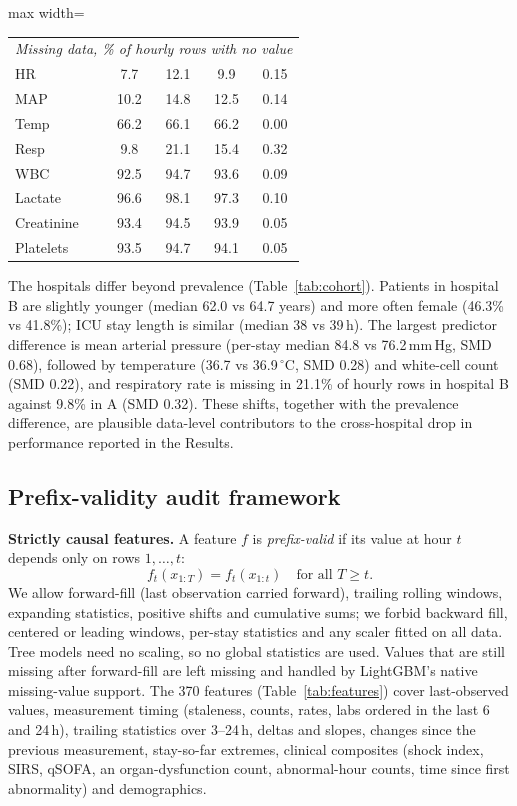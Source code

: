 \documentclass[preprint,12pt]{elsarticle}
\begin{document}
\begin{table}[!t]
\begin{adjustbox}{max width=\linewidth}
\begin{tabular}{lcccc}
\midrule
\multicolumn{5}{l}{\emph{Missing data, \% of hourly rows with no value}} \\
HR & 7.7 & 12.1 & 9.9 & 0.15 \\
MAP & 10.2 & 14.8 & 12.5 & 0.14 \\
Temp & 66.2 & 66.1 & 66.2 & 0.00 \\
Resp & 9.8 & 21.1 & 15.4 & 0.32 \\
WBC & 92.5 & 94.7 & 93.6 & 0.09 \\
Lactate & 96.6 & 98.1 & 97.3 & 0.10 \\
Creatinine & 93.4 & 94.5 & 93.9 & 0.05 \\
Platelets & 93.5 & 94.7 & 94.1 & 0.05 \\
\bottomrule
\end{tabular}
\end{adjustbox}
\end{table}


The hospitals differ beyond prevalence (Table~\ref{tab:cohort}). Patients in hospital B are slightly younger (median 62.0 vs 64.7 years) and more often female (46.3\% vs 41.8\%); ICU stay length is similar (median 38 vs 39\,h). The largest predictor difference is mean arterial pressure (per-stay median 84.8 vs 76.2\,mm\,Hg, SMD 0.68), followed by temperature (36.7 vs 36.9\,$^\circ$C, SMD 0.28) and white-cell count (SMD 0.22), and respiratory rate is missing in 21.1\% of hourly rows in hospital B against 9.8\% in A (SMD 0.32). These shifts, together with the prevalence difference, are plausible data-level contributors to the cross-hospital drop in performance reported in the Results.


\subsection{Prefix-validity audit framework}
\label{sec:method}
\label{sec:audit}
\textbf{Strictly causal features.} A feature $f$ is \emph{prefix-valid} if its value at hour $t$ depends only on rows $1,\dots,t$:
\begin{equation}
f_t(x_{1:T}) = f_t(x_{1:t}) \quad \text{for all } T\ge t.
\label{eq:prefix}
\end{equation}
We allow forward-fill (last observation carried forward), trailing rolling windows, expanding statistics, positive shifts and cumulative sums; we forbid backward fill, centered or leading windows, per-stay statistics and any scaler fitted on all data. Tree models need no scaling, so no global statistics are used. Values that are still missing after forward-fill are left missing and handled by LightGBM's native missing-value support. The 370 features (Table~\ref{tab:features}) cover last-observed values, measurement timing (staleness, counts, rates, labs ordered in the last 6 and 24\,h), trailing statistics over 3--24\,h, deltas and slopes, changes since the previous measurement, stay-so-far extremes, clinical composites (shock index, SIRS, qSOFA, an organ-dysfunction count, abnormal-hour counts, time since first abnormality) and demographics.
\end{document}
